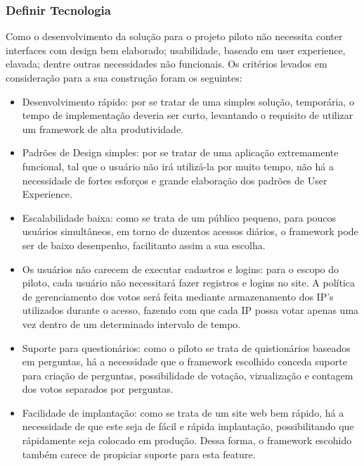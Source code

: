 \subsubsection{Definir Tecnologia}
\label{sub:definir_tecnologia}
Como o desenvolvimento da solução para o projeto piloto não necessita conter interfaces com design bem elaborado;
usabilidade, baseado em user experience, elavada; dentre outras necessidades não funcionais. Os critérios levados em
consideração para a sua construção foram os seguintes:

\begin{itemize}
    \item Desenvolvimento rápido: por se tratar de uma simples solução, temporária, o tempo de implementação deveria
        ser curto, levantando o requisito de utilizar um framework de alta produtividade.
    \item Padrões de Design simples: por se tratar de uma aplicação extremamente funcional, tal que o usuário não irá
        utilizá-la por muito tempo, não há a necessidade de fortes esforços e grande elaboração dos padrões de
        User Experience.
    \item Escalabilidade baixa: como se trata de um público pequeno, para poucos usuários simultâneos, em torno de duzentos
        acessos diários, o framework pode ser de baixo desenpenho, facilitanto assim a sua escolha.
    \item Os usuários não carecem de executar cadastros e logins: para o escopo do piloto, cada usuário não necessitará
        fazer registros e logins no site. A política de gerenciamento dos votos será feita mediante armazenamento dos
        IP's utilizados durante o acesso, fazendo com que cada IP possa votar apenas uma vez dentro de um determinado
        intervalo de tempo.
    \item Suporte para questionários: como o piloto se trata de quistionários baseados em perguntas, há a necessidade que o framework
        escolhido conceda suporte para criação de perguntas, possibilidade de votação, vizualização e contagem dos votos
        separados por perguntas.
    \item Facilidade de implantação: como se trata de um site web bem rápido, há a necessidade de que este seja de fácil e rápida
        implantação, possibilitando que rápidamente seja colocado em produção. Dessa forma, o framework escohido também carece
        de propiciar suporte para esta feature.
\end{itemize}


